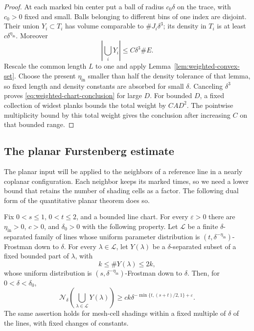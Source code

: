 \begin{proof}
At each marked bin center put a ball of radius $c_0\delta$ on the
trace, with $c_0>0$ fixed and small. Balls belonging to different
bins of one index are disjoint. Their union $Y_i\subset T_i$ has
volume comparable to $\#J_i\delta^3$; its density in $T_i$ is at
least $c\delta^{\eta_{\mathrm{in}}}$. Moreover
\[
 \left|\bigcup_iY_i\right|\le C\delta^3\#E.
\]
Rescale the common length $L$ to one and apply
Lemma~\ref{lem:weighted-convex-set}. Choose the present $\eta_{\mathrm{in}}$
smaller than half the density tolerance of that lemma, so fixed
length and density constants are absorbed for small $\delta$.
Canceling $\delta^3$ proves \eqref{eq:weighted-chart-conclusion}
for large $D$. For bounded $D$, a fixed collection of widest
planks bounds the total weight by $CA D^2$. The pointwise
multiplicity bound by this total weight gives the conclusion
after increasing $C$ on that bounded range.
\end{proof}

\subsection{The planar Furstenberg estimate}

The planar input will be applied to the neighbors of a reference line
in a nearly coplanar configuration. Each neighbor keeps its marked times,
so we need a lower bound that retains the number of shading cells as a
factor. The following dual form of the quantitative planar theorem does
so.

\begin{theorem}
\label{thm:furstenberg-input}
Fix $0<s\le1$, $0<t\le2$, and a bounded line chart. For every
$\varepsilon>0$ there are $\eta_{\mathrm{in}}>0$, $c>0$, and $\delta_0>0$ with
the following property. Let $\mathcal L$ be a finite
$\delta$-separated family of lines whose uniform parameter
distribution is $(t,\delta^{-\eta_{\mathrm{in}}})$-Frostman down to $\delta$.
For every $\lambda\in\mathcal L$, let $Y(\lambda)$ be a
$\delta$-separated subset of a fixed bounded part of $\lambda$,
with
\[
 k\le\#Y(\lambda)\le2k,
\]
whose uniform distribution is
$(s,\delta^{-\eta_{\mathrm{in}}})$-Frostman down to $\delta$. Then, for
$0<\delta<\delta_0$,
\begin{equation}\label{eq:furstenberg-input}
 \mathcal N_\delta\left(\bigcup_{\lambda\in\mathcal L}Y(\lambda)\right)
 \ge c k\delta^{-\min\{t,(s+t)/2,1\}+\varepsilon}.
\end{equation}
The same assertion holds for mesh-cell shadings within a fixed
multiple of $\delta$ of the lines, with fixed changes of constants.
\end{theorem}

